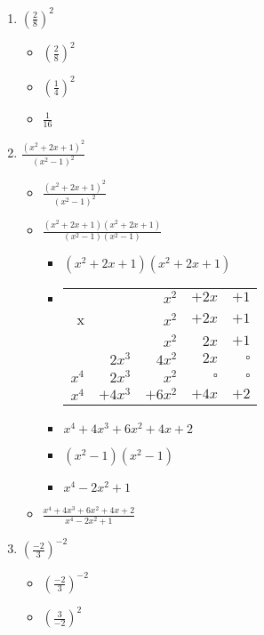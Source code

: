 \begin{enumerate}
\item {\Large $(\frac{2}{8})^{2}$}
  \begin{itemize}
  \item {\Large $(\frac{2}{8})^{2}$}
  \item {\Large $(\frac{1}{4})^{2}$}
  \item {\Large $\frac{1}{16}$}
  \end{itemize}
\item {\Large $\frac{(x^{2}+2x+1)^{2}}{(x^{2}-1)^{2}}$}
  \begin{itemize}
  \item {\Large $\frac{(x^{2}+2x+1)^{2}}{(x^{2}-1)^{2}}$}
  \item {\Large $\frac{(x^{2}+2x+1)(x^{2}+2x+1)}{(x^{2}-1)(x^{2}-1)}$}
    \begin{itemize}
    \item $(x^{2}+2x+1)(x^{2}+2x+1)$
    \item [] \begin{tabular}{rrrrr}
                    &          & $x^{2}$  & $+2x$     &$+1$\\
                   x&          & $x^{2}$  & $+2x$     &$+1$\\\hline
                    &          & $x^{2}$  & $2x$      &$+1$\\
                    & $2x^{3}$ & $4x^{2}$ & $2x$      &$\square$\\
             $x^{4}$& $2x^{3}$ & $x^{2}$  & $\square$ &$\square$\\\hline
             $x^{4}$&$+4x^{3}$ &$+6x^{2}$ & $+4x$     &$+2$\\
           \end{tabular}
    \item $x^{4}+4x^{3}+6x^{2}+4x+2$
    \end{itemize}
    \begin{itemize}
    \item $(x^{2}-1)(x^{2}-1)$
    \item $x^{4}-2x^{2}+1$
    \end{itemize}
  \item {\Large $\frac{x^{4}+4x^{3}+6x^{2}+4x+2}{x^{4}-2x^{2}+1}$}
  \end{itemize}
\item {\Large $(\frac{-2}{3})^{-2}$}
  \begin{itemize}
  \item {\Large $(\frac{-2}{3})^{-2}$}
  \item {\Large $(\frac{3}{-2})^{2}$}

\end{itemize}
\end{enumerate}
